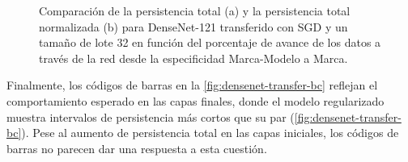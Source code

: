 \begin{figure}[H]
\begin{subfigure}
		\caption{Persistencia total normalizada según el porcentaje de avance en la
			red para el modelo DenseNet-121 transferido desde la especificidad Marca-Modelo
			a Marca.}
		\label{fig:densenet-transfer-2}
	\end{subfigure}
	\caption{Comparación de la persistencia total (a) y la persistencia total
		normalizada (b) para DenseNet-121 transferido con SGD y un tamaño de lote 32
		en función del porcentaje de avance de los datos a través de la red desde la
		especificidad Marca-Modelo a Marca.}
	\label{fig:densenet-transfer}
\end{figure}

Finalmente, los códigos de barras en la \autoref{fig:densenet-transfer-bc} reflejan
el comportamiento esperado en las capas finales, donde el modelo regularizado
muestra intervalos de persistencia más cortos que su par (\autoref{fig:densenet-transfer-bc}).
Pese al aumento de persistencia total en las capas iniciales, los códigos de
barras no parecen dar una respuesta a esta cuestión.

